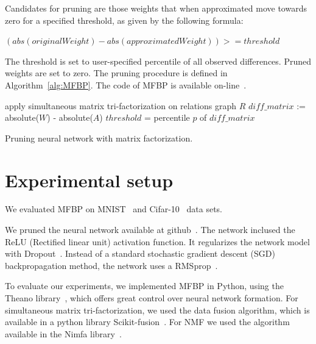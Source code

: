 \documentclass{article} %
\begin{document}
Candidates for pruning are those weights that when approximated move towards zero for a 
specified threshold, as given by the following formula:

$(abs(originalWeight) - abs(approximatedWeight)) >= threshold$

The threshold is set to user-specified percentile of all observed differences. Pruned 
weights are set to zero. The pruning procedure is defined in Algorithm~\ref{alg:MFBP}.
The code of MFBP is available on-line~\cite{code}.
\begin{algorithm}[H]
\label{alg:MFBP}
 apply simultaneous matrix tri-factorization on relations graph $R$\;
 $diff\_matrix$ := absolute($W$) - absolute($A$)\;
 $threshold$ = percentile $p$ of $diff\_matrix$\;
 \caption{Pruning neural network with matrix factorization.}
 
\end{algorithm}

\section{Experimental setup}

We evaluated MFBP on MNIST~\cite{lecun-mnisthandwrittendigit-2010} and 
Cifar-10~\cite{krizhevsky2009learning} data sets. 

We pruned the neural network available at github~\cite{github}. The network inclused the 
ReLU (Rectified linear unit) activation function. It regularizes the network model with 
Dropout~\cite{srivastava2014dropout}. Instead of a standard stochastic gradient descent 
(SGD) backpropagation method, the network uses a RMSprop~\cite{lecture}. 

To evaluate our experiments, we implemented MFBP in Python, using the Theano 
library~\cite{Bastien-Theano-2012, bergstra+al:2010-scipy}, which offers great control 
over neural network formation. For simultaneous matrix tri-factorization, we used the data
fusion algorithm, which is  available in a python library 
Scikit-fusion~\cite{zitnik2015data}. For NMF we used the algorithm available in the Nimfa 
library~\cite{Zitnik2012}.
\end{document}
